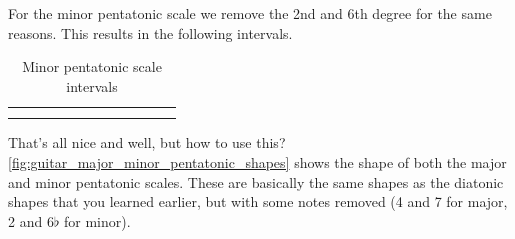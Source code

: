 For the minor pentatonic scale we remove the 2nd and 6th degree for the same reasons. This results in the following intervals.

\begin{table}[h]
	\centering
	\begin{NiceTabular}{*{12}{P{0.05mm}}}
		\Block{}{} &  & &  & &  & &  & &  & & \Block{}{} \\
		 & &  & &  & &  & &  & &  & 
	\end{NiceTabular}
	\caption{Minor pentatonic scale intervals}
	\label{tab:guitar_minor_pentatic_scale}
\end{table}


That's all nice and well, but how to use this? \autoref{fig:guitar_major_minor_pentatonic_shapes} shows the shape of both the major and minor pentatonic scales. These are basically the same shapes as the diatonic shapes that you learned earlier, but with some notes removed (4 and 7 for major, 2 and 6$\flat$ for minor).

